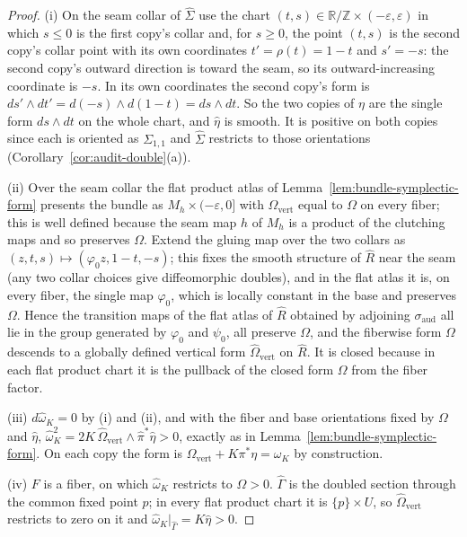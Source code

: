 \documentclass[11pt]{article}
\theoremstyle{definition}
\begin{document}
\begin{proof}
(i) On the seam collar of $\hat\Sigma$ use the chart
$(t,s)\in\mathbb R/\mathbb Z\times(-\varepsilon,\varepsilon)$ in which
$s\le0$ is the first copy's collar and, for $s\ge0$, the point $(t,s)$ is the
second copy's collar point with its own coordinates $t'=\rho(t)=1-t$ and
$s'=-s$: the second copy's outward direction is toward the seam, so its
outward-increasing coordinate is $-s$.  In its own coordinates the second
copy's form is $ds'\wedge dt'=d(-s)\wedge d(1-t)=ds\wedge dt$.  So the two
copies of $\eta$ are the single form $ds\wedge dt$ on the whole chart, and
$\hat\eta$ is smooth.  It is positive on both copies since each is oriented
as $\Sigma_{1,1}$ and $\hat\Sigma$ restricts to those orientations
(Corollary~\ref{cor:audit-double}(a)).

(ii) Over the seam collar the flat product atlas of
Lemma~\ref{lem:bundle-symplectic-form} presents the bundle as
$M_h\times(-\varepsilon,0]$ with $\Omega_{\mathrm{vert}}$ equal to $\Omega$
on every fiber; this is well defined because the seam map $h$ of $M_h$ is a
product of the clutching maps and so preserves $\Omega$.  Extend the gluing map over the two collars as
$(z,t,s)\mapsto(\varphi_0 z,1-t,-s)$; this fixes the smooth structure of
$\hat R$ near the seam (any two collar choices give diffeomorphic doubles),
and in the flat atlas it is, on every fiber, the single map $\varphi_0$,
which is locally constant in the base and preserves $\Omega$.  Hence the transition maps of the flat atlas of $\hat R$
obtained by adjoining $\sigma_{\mathrm{aud}}$ all lie in the group generated
by $\varphi_0$ and $\psi_0$, all preserve $\Omega$, and the fiberwise form
$\Omega$ descends to a globally defined vertical form
$\hat\Omega_{\mathrm{vert}}$ on $\hat R$.  It is closed because in each flat
product chart it is the pullback of the closed form $\Omega$ from the fiber
factor.

(iii) $d\hat\omega_K=0$ by (i) and (ii), and with the fiber and base
orientations fixed by $\Omega$ and $\hat\eta$,
$\hat\omega_K^2=2K\,\hat\Omega_{\mathrm{vert}}\wedge\hat\pi^*\hat\eta>0$,
exactly as in Lemma~\ref{lem:bundle-symplectic-form}.  On each copy the form
is $\Omega_{\mathrm{vert}}+K\pi^*\eta=\omega_K$ by construction.

(iv) $F$ is a fiber, on which $\hat\omega_K$ restricts to $\Omega>0$.
$\hat\Gamma$ is the doubled section through the common fixed point $p$; in
every flat product chart it is $\{p\}\times U$, so
$\hat\Omega_{\mathrm{vert}}$ restricts to zero on it and
$\hat\omega_K|_{\hat\Gamma}=K\hat\eta>0$.


\end{proof}
\end{document}
